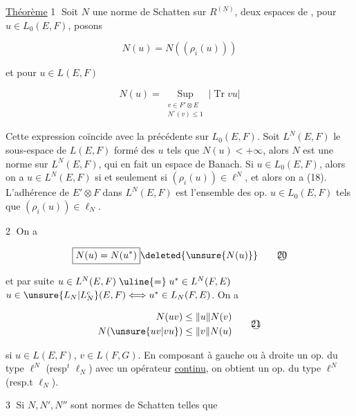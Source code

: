 
\uline{Théorème} \textcircled{1} Soit $N$ une norme de Schatten sur $R^{(\underline N)}$,  deux espaces de ,  pour $u\in L_0(E,F)$, posons

\[
N(u)=N((\rho_i(u)))\tag*{(18)}
\]

et pour $u\in L(E,F)$

\[
N(u)=\underset{\substack{v\in F'\otimes E\\N^\circ(v)\leq 1}}{\operatorname{Sup}}|\operatorname{Tr}vu|\tag*{(19)}
\]

Cette  expression coïncide avec la précédente sur $L_0(E,F)$. Soit $L^N(E,F)$ le sous-espace de $L(E,F)$ formé des $u$ tels que $N(u)<+\infty$, alors $N$ est une norme sur $L^N(E,F)$, qui en fait un espace de Banach.  Si $u\in L_0(E,F)$, alors on a $u\in L^N(E,F)$ si et seulement si $(\rho_i(u))\in\ell^N$, et alors on a (18).  L'adhérence  de $E'\otimes F$ dans $L^N(E,F)$ est l'ensemble des op.  $u\in L_0(E,F)$ tels que $(\rho_i(u))\in\ell_N$.

\textcircled{2} On a

\[
\boxed{N(u)=N(u^*)}\deleted{\unsure{N(u)}}\tag*{\textcircled{20}}
\]

et par suite $u\in L^N(E,F)\mathrel{\uline{=}}u^*\in L^N(F,E)$  $u\in \unsure{L_N|L_N^c}(E,F)\Longleftrightarrow u^*\in L_N(F,E)$. On a


\[
\begin{aligned}
N(uv)&\leq\lVert u\rVert N(v)\\
N(\unsure{uv|vu})&\leq\lVert v\rVert N(u)
\end{aligned}\tag*{\textcircled{21}}
\]

si $u\in L(E,F)$, $v\in L(F,G)$.  En composant à gauche ou à droite un op.  du type $\ell^N$ (resp$^t$ $\ell_N$) avec un opérateur  \uline{continu}, on obtient un op. du type $\ell^N$ (resp.t $\ell_N$). 

\textcircled{3}  Si $N,N',N''$ sont  normes de Schatten telles que

